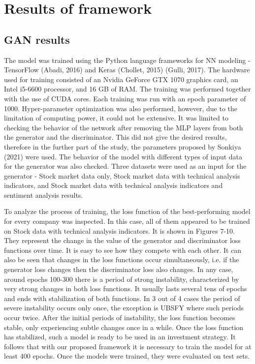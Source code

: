 \documentclass[11pt]{article} %
\begin{document}
\section{Results of framework}

\subsection{GAN results}

The model was trained using the Python language frameworks for NN modeling - TensorFlow (Abadi, 2016) and Keras (Chollet, 2015) (Gulli, 2017). The hardware used for training consisted of an Nvidia GeForce GTX 1070 graphics card, an Intel i5-6600 processor, and 16 GB of RAM. The training was performed together with the use of CUDA cores. Each training was run with an epoch parameter of 1000. Hyper-parameter optimization was also performed,  however, due to the limitation of computing power, it could not be extensive. It was limited to checking the behavior of the network after removing the MLP layers from both the generator and the discriminator. This did not give the desired results, therefore in the further part of the study, the parameters proposed by Sonkiya (2021) were used. The behavior of the model with different types of input data for the generator was also checked. Three datasets were used as an input for the generator - Stock market data only, Stock market data with technical analysis indicators, and Stock market data with technical analysis indicators and sentiment analysis results.

To analyze the process of training, the loss function of the best-performing model for every company was inspected. In this case, all of them appeared to be trained on Stock data with technical analysis indicators. It is shown in Figures 7-10. They represent the change in the value of the generator and discriminator loss functions over time. It is easy to see how they compete with each other. It can also be seen that changes in the loss functions occur simultaneously, i.e. if the generator loss changes then the discriminator loss also changes. In any case, around epochs 100-300 there is a period of strong instability, characterized by very strong changes in both loss functions. It usually lasts several tens of epochs and ends with stabilization of both functions. In 3 out of 4 cases the period of severe instability occurs only once, the exception is UBSFY where such periods occur twice. After the initial periods of instability, the loss function becomes stable, only experiencing subtle changes once in a while. Once the loss function has stabilized, such a model is ready to be used in an investment strategy. It follows that with our proposed framework it is necessary to train the model for at least 400 epochs. Once the models were trained, they were evaluated on test sets. 
\end{document}
